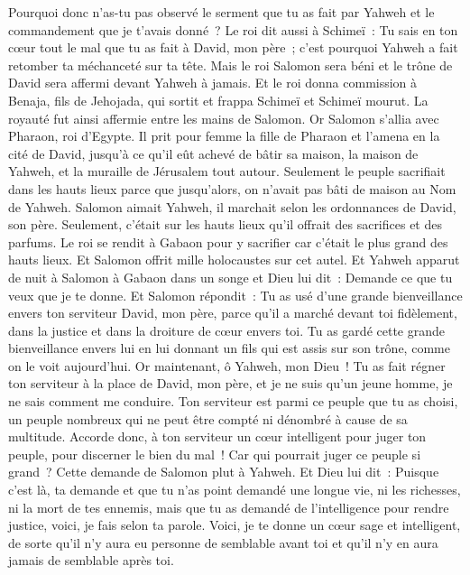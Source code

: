 \begin{multicols}{2}
Pourquoi donc n'as-tu pas observé le serment que tu as fait par Yahweh et le commandement que je t'avais donné~?
Le roi dit aussi à Schimeï~: Tu sais en ton cœur tout le mal que tu as fait à David, mon père~; c'est pourquoi Yahweh a fait retomber ta méchanceté sur ta tête.
Mais le roi Salomon sera béni et le trône de David sera affermi devant Yahweh à jamais.
Et le roi donna commission à Benaja, fils de Jehojada, qui sortit et frappa Schimeï et Schimeï mourut. La royauté fut ainsi affermie entre les mains de Salomon.
\VerseOne{}Or Salomon s'allia avec Pharaon, roi d'Egypte. Il prit pour femme la fille de Pharaon et l'amena en la cité de David, jusqu'à ce qu'il eût achevé de bâtir sa maison, la maison de Yahweh, et la muraille de Jérusalem tout autour.
Seulement le peuple sacrifiait dans les hauts lieux parce que jusqu'alors, on n'avait pas bâti de maison au Nom de Yahweh.
Salomon aimait Yahweh, il marchait selon les ordonnances de David, son père. Seulement, c'était sur les hauts lieux qu'il offrait des sacrifices et des parfums.
Le roi se rendit à Gabaon pour y sacrifier car c'était le plus grand des hauts lieux. Et Salomon offrit mille holocaustes sur cet autel.
Et Yahweh apparut de nuit à Salomon à Gabaon dans un songe et Dieu lui dit~: Demande ce que tu veux que je te donne.
Et Salomon répondit~: Tu as usé d'une grande bienveillance envers ton serviteur David, mon père, parce qu'il a marché devant toi fidèlement, dans la justice et dans la droiture de cœur envers toi. Tu as gardé cette grande bienveillance envers lui en lui donnant un fils qui est assis sur son trône, comme on le voit aujourd'hui.
Or maintenant, ô Yahweh, mon Dieu~! Tu as fait régner ton serviteur à la place de David, mon père, et je ne suis qu'un jeune homme, je ne sais comment me conduire.
Ton serviteur est parmi ce peuple que tu as choisi, un peuple nombreux qui ne peut être compté ni dénombré à cause de sa multitude.
Accorde donc, à ton serviteur un cœur intelligent pour juger ton peuple, pour discerner le bien du mal~! Car qui pourrait juger ce peuple si grand~?
Cette demande de Salomon plut à Yahweh.
Et Dieu lui dit~: Puisque c'est là, ta demande et que tu n'as point demandé une longue vie, ni les richesses, ni la mort de tes ennemis, mais que tu as demandé de l'intelligence pour rendre justice,
voici, je fais selon ta parole. Voici, je te donne un cœur sage et intelligent, de sorte qu'il n'y aura eu personne de semblable avant toi et qu'il n'y en aura jamais de semblable après toi.

\end{multicols}
